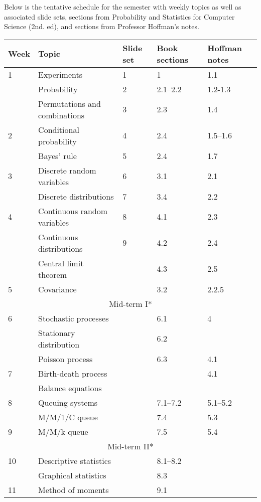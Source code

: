 \documentclass[10pt]{article}
\begin{document}
\pagestyle{fancy} 

Below is the tentative schedule for the semester with weekly topics as well as associated slide sets, sections from Probability and Statistics for Computer Science (2nd. ed), and sections from Professor Hoffman's notes.

\begin{center}
\begin{tabular}{|l|l|l|l|l|}
\hline
Week & Topic & Slide set & Book sections & Hoffman notes \\
\hline
1 & Experiments & 1 & 1 & 1.1 \\
& Probability & 2  & 2.1--2.2 & 1.2-1.3 \\
& Permutations and combinations & 3 & 2.3 & 1.4 \\
\hline
2 & Conditional probability & 4 & 2.4 & 1.5--1.6 \\
& Bayes' rule & 5 & 2.4 & 1.7 \\
\hline
3 & Discrete random variables & 6 & 3.1 & 2.1\\
& Discrete distributions & 7 & 3.4 & 2.2 \\
\hline
4 & Continuous random variables & 8 & 4.1 & 2.3 \\
& Continuous distributions & 9 & 4.2 & 2.4 \\
& Central limit theorem & & 4.3 & 2.5 \\
\hline 
5 & Covariance &  & 3.2 & 2.2.5 \\
\hline
\hline
\multicolumn{5}{|c|}{Mid-term I*} \\
\hline
\hline
6 & Stochastic processes & & 6.1 & 4 \\
& Stationary distribution &  & 6.2 & \\
& Poisson process &  & 6.3 & 4.1 \\
\hline
7 & Birth-death process &   & & 4.1 \\
& Balance equations &  & & \\
\hline
8 & Queuing systems &  & 7.1--7.2 & 5.1--5.2 \\
& M/M/1/C queue &  & 7.4 & 5.3 \\
\hline
9 & M/M/k queue &  & 7.5 & 5.4 \\
\hline
\hline
\multicolumn{5}{|c|}{Mid-term II*} \\
\hline
\hline
10 & Descriptive statistics &  & 8.1--8.2 & \\
& Graphical statistics &  & 8.3 & \\
\hline 
11 & Method of moments &  & 9.1 & \\

\end{tabular}
\end{center}
\end{document}
